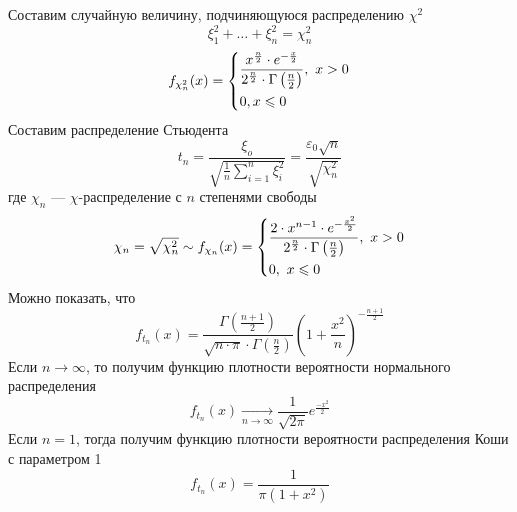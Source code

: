 Составим случайную величину, подчиняющуюся распределению $\chi^2$
\[
	\xi_1^2 + \ldots + \xi_n^2 = \chi_n^2
\]
\[
	f_{\chi_n^2} (x) = \begin{dcases*}
	\frac{x^{\frac{n}{2}} \cdot e^{-\frac{x}{2}} }{2^{\frac{n}{2}} \cdot \Gamma \left( \frac{n}{2} \right)}, \ x > 0 \\
	0, x \leqslant 0
	\end{dcases*}
\]
Составим распределение Стьюдента
\[
	t_n = \frac{\xi_o}{\sqrt{\frac{1}{n} \sum\limits_{i=1}^{n} \xi_i^2}} = \frac{\varepsilon_0 \sqrt{n}}{\sqrt{\chi_n^2}} 
\]
где $\chi_n$ --- $\chi$-распределение с $n$ степенями свободы
\[
	\chi_n = \sqrt{\chi_n^2} \sim f_{\chi_n} (x) = \begin{dcases*}
	\frac{2 \cdot x^{n-1} \cdot e^{-\frac{x^2}{2}}}{2^{\frac{n}{2}} \cdot \Gamma \left( \frac{n}{2} \right)}, \ x > 0\\
	0, \ x \leqslant 0
	\end{dcases*}
\]
Можно показать, что
\[
	f_{t_n} (x) = \frac{\Gamma \left( \frac{n + 1}{2} \right)}{\sqrt{n \cdot \pi} \cdot \Gamma \left( \frac{n}{2} \right)} \left( 1 + \frac{x^2}{n} \right)^{-\frac{n+1}{2}}
\]
Если $n \to \infty$, то получим функцию плотности вероятности нормального распределения
\[
	f_{t_n} (x) \underset{n \to \infty}{\rightarrow} \frac{1}{\sqrt{2\pi}} e^{\frac{-x^2}{2}}
\]
Если $n = 1$, тогда получим функцию плотности вероятности распределения Коши с параметром 1
\[
	f_{t_n} (x) = \frac{1}{\pi (1 + x^2)}
\]
